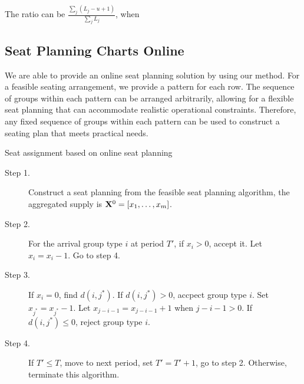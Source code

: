 The ratio can be $\frac{\sum_{j} (L_j -u +1)}{\sum_{j} L_j}$, when 


\subsection{Seat Planning Charts Online}
We are able to provide an online seat planning solution by using our method. For a feasible seating arrangement, we provide a pattern for each row. The sequence of groups within each pattern can be arranged arbitrarily, allowing for a flexible seat planning that can accommodate realistic operational constraints. Therefore, any fixed sequence of groups within each pattern can be used to construct a seating plan that meets practical needs.

\begin{algorithm}[H]
  \caption{Seat assignment based on online seat planning}\label{seat_online}
  \begin{description}
    \item[Step 1.] Construct a seat planning from the feasible seat planning algorithm, the aggregated supply is $\mathbf{X}^{0} = [x_1,\ldots,x_{m}]$.
    \item[Step 2.] For the arrival group type $i$ at period $T{'}$, if $x_{i} > 0$, accept it. Let $x_{i} = x_{i} -1$. Go to step 4.
    \item[Step 3.] If $x_{i} = 0$, find $d(i,j^{*})$. If $d(i,j^{*})>0$, accpect group type $i$. Set $x_{j^{*}} = x_{j^{*}} -1$. Let $x_{j-i-1} = x_{j-i-1} + 1$ when $j-i-1>0$. If $d(i,j^{*}) \leq 0$, reject group type $i$.
    \item[Step 4.] If $T{'} \leq T$, move to next period, set $T{'} = T{'}+1$, go to step 2. Otherwise, terminate this algorithm.
  \end{description}
\end{algorithm}







